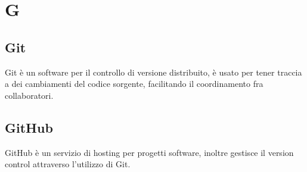 \section{G}
\subsection{Git}
Git è un software per il controllo di versione distribuito,  è usato per tener traccia a dei cambiamenti del codice sorgente, facilitando il coordinamento fra collaboratori.

\subsection{GitHub}
GitHub è un servizio di hosting per progetti software,  inoltre gestisce il version control attraverso l'utilizzo di Git.
\clearpage